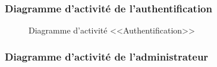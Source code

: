 \documentclass[12pt]{report}
\begin{document}
\newpage

\subsubsection{Diagramme d'activité de l'authentification}

\vspace{0.3in}

\begin{figure}[h]
\centering
    \centerline{}
    \caption{Diagramme d'activité <<Authentification>>}
\end{figure}

\newpage

\subsubsection{Diagramme d'activité de l'administrateur}
\end{document}
